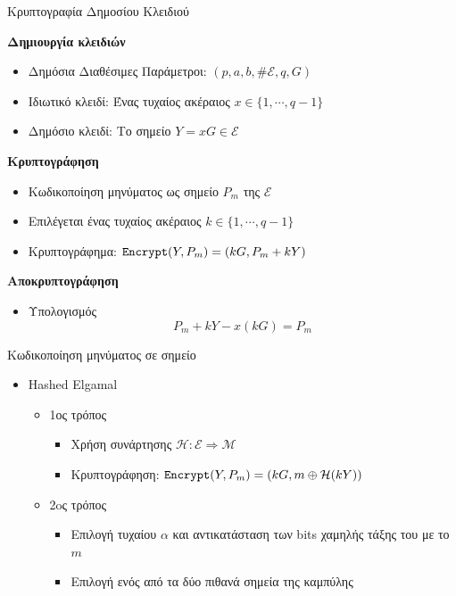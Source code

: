 \documentclass[handout]{beamer}
\begin{document}
\begin{frame}{Κρυπτογραφία Δημοσίου Κλειδιού}

\textbf{Δημιουργία κλειδιών }
\begin{itemize}
\item Δημόσια Διαθέσιμες Παράμετροι: $(p,a,b,\# \mathcal E,q,G)$ \pause
\item Ιδιωτικό κλειδί: Ένας τυχαίος ακέραιος $x \in \{1, \cdots, q-1 \}$ \pause
\item Δημόσιο κλειδί: Το σημείο $Y=xG \in \mathcal{E}$ \pause
\end{itemize}

\textbf{Κρυπτογράφηση}
\begin{itemize}
\item Κωδικοποίηση μηνύματος ως σημείο $P_m$ της $\mathcal{E}$ \pause
\item Επιλέγεται ένας τυχαίος ακέραιος $k \in \{1, \cdots, q-1 \}$ \pause
\item Κρυπτογράφημα: $\mathtt{Encrypt}(Y,P_m) = (kG,P_m+kY)$ \pause
\end{itemize}

\textbf{Αποκρυπτογράφηση}
\begin{itemize}
\item Υπολογισμός \[P_m+kY-x(kG)=P_m\] 
\end{itemize}

\end{frame}

\begin{frame}{Κωδικοποίηση μηνύματος σε σημείο}
\begin{itemize}
\item Hashed Elgamal
\begin{itemize}
\item 1ος τρόπος
\begin{itemize}
\item Χρήση συνάρτησης $\mathcal{H}: \mathcal{E} \Rightarrow \mathcal{M}$
\item Κρυπτογράφηση: $\mathtt{Encrypt}(Y,P_m) = (kG, m\oplus \mathcal{H}(kY))$
\end{itemize}
\item 2oς τρόπος
\begin{itemize}
\item Επιλογή τυχαίου $\alpha$ και αντικατάσταση των bits χαμηλής τάξης του με το $m$
\item Επιλογή ενός από τα δύο πιθανά σημεία της καμπύλης
\end{itemize}
\end{itemize}
\end{itemize}
\end{frame}
\end{document}
